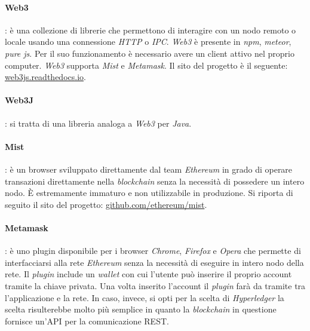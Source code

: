 \paragraph{Web3}: è una collezione di librerie che permettono di interagire con un nodo remoto o locale usando una connessione \emph{HTTP} o \emph{IPC}. \emph{Web3} è presente in \emph{npm}, \emph{meteor}, \emph{pure js}. Per il suo funzionamento è necessario avere un client attivo nel proprio computer. \emph{Web3} supporta \emph{Mist} e \emph{Metamask}. Il sito del progetto è il seguente: \url{web3js.readthedocs.io}.
\paragraph{Web3J}: si tratta di una libreria analoga a \emph{Web3} per \emph{Java}.
\paragraph{Mist}: è un browser sviluppato direttamente dal team \emph{Ethereum} in grado di operare transazioni direttamente nella \emph{blockchain} senza la necessità di possedere un intero nodo. È estremamente immaturo e non utilizzabile in produzione. Si riporta di seguito il sito del progetto: \url{github.com/ethereum/mist}.
\paragraph{Metamask}: è uno plugin disponibile per i browser \emph{Chrome}, \emph{Firefox} e \emph{Opera} che permette di interfacciarsi alla rete \emph{Ethereum} senza la necessità di eseguire in intero nodo della rete. Il \emph{plugin} include un \emph{wallet} con cui l’utente può inserire il proprio account tramite la chiave privata. Una volta inserito l’account il \emph{plugin} farà da tramite tra l’applicazione e la rete.
In caso, invece, si opti per la scelta di \emph{Hyperledger} la scelta risulterebbe molto più semplice in quanto la \emph{blockchain} in questione fornisce un’API per la comunicazione REST.


